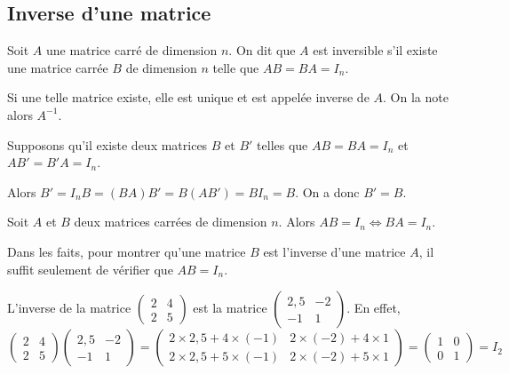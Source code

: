 \documentclass[11pt,fleqn]{book} %
\begin{document}
\subsection{Inverse d'une matrice}

\begin{definition}Soit $A$ une matrice carré de dimension $n$. On dit que $A$ est inversible s'il existe une matrice carrée $B$ de dimension $n$ telle que $AB = BA = I_n$.

Si une telle matrice existe, elle est unique et est appelée inverse de $A$. On la note alors $A^{-1}$.\end{definition}

\begin{demonstration}Supposons qu'il existe deux matrices $B$ et $B'$ telles que $AB=BA=I_n$ et $AB'=B'A=I_n$.

Alors $B' = I_n B = (BA) B' = B(AB') = BI_n = B$. On a donc $B'=B$.\end{demonstration}

\begin{proposition}Soit $A$ et $B$ deux matrices carrées de dimension $n$. Alors $AB=I_n \Leftrightarrow BA=I_n$.\end{proposition}

Dans les faits, pour montrer qu'une matrice $B$ est l'inverse d'une matrice $A$, il suffit seulement de vérifier que $AB=I_n$.

\begin{example}L'inverse de la matrice $\begin{pmatrix}2 & 4 \\ 2 & 5\end{pmatrix}$ est la matrice $\begin{pmatrix}2,5 & -2 \\ -1 & 1
\end{pmatrix}$.
En effet, 
\[\begin{pmatrix}2 & 4 \\ 2 & 5\end{pmatrix}\begin{pmatrix}2,5 & -2 \\ -1 & 1
\end{pmatrix} = \begin{pmatrix} 2 \times 2,5 + 4 \times (-1) & 2 \times (-2) +4 \times 1 \\2 \times 2,5 +5 \times(-1) & 2 \times (-2) + 5 \times 1 \end{pmatrix} = \begin{pmatrix} 1 & 0 \\ 0 & 1\end{pmatrix}=I_2\]\end{example}
\end{document}
